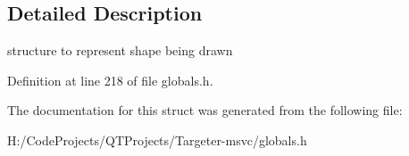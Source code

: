 \subsection{Detailed Description}
structure to represent shape being drawn 

Definition at line 218 of file globals.\+h.



The documentation for this struct was generated from the following file\+:\begin{DoxyCompactItemize}
\item 
H\+:/\+Code\+Projects/\+Q\+T\+Projects/\+Targeter-\/msvc/globals.\+h\end{DoxyCompactItemize}
